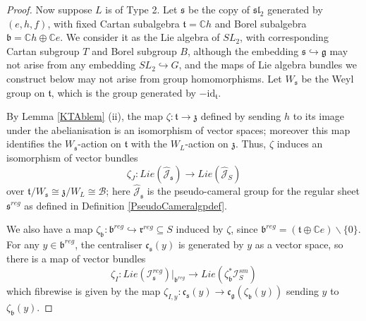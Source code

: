 \documentclass{amsart}
\theoremstyle{remark}
\numberwithin{theorem}{section}
\numberwithin{equation}{section}
\begin{document}
\begin{proof}
Now suppose $L$ is of Type 2. Let $\mathfrak{s}$ be the copy of $\mathfrak{sl}_2$ generated by $(e,h,f)$, with fixed Cartan subalgebra $\mathfrak{t} = \mathbb{C}h$ and Borel subalgebra $\mathfrak{b} = \mathbb{C}h \oplus \mathbb{C}e$. We consider it as the Lie algebra of $SL_2$, with corresponding Cartan subgroup $T$ and Borel subgroup $B$, although the embedding $\mathfrak{s} \hookrightarrow\mathfrak{g}$ may not arise from any embedding $SL_2 \hookrightarrow G$, and the maps of Lie algebra bundles we construct below may not arise from group homomorphisms. Let $W_{\mathfrak{s}}$ be the Weyl group on $\mathfrak{t}$, which is the group generated by $-\text{id}_{\mathfrak{t}}$. 

By Lemma \ref{KTAblem} (ii), the map $\zeta:\mathfrak{t} \rightarrow \mathfrak{z}$ defined by sending $h$ to its image under the abelianisation is an isomorphism of vector spaces; moreover this map identifies the $W_{\mathfrak{s}}$-action on $\mathfrak{t}$ with the $W_L$-action on $\mathfrak{z}$. Thus, $\zeta$ induces an isomorphism of vector bundles
\begin{equation}\label{MLCameralSMooth4eqn}
    \zeta_J:Lie(\hat{\mathcal J}_{\mathfrak{s}}) \rightarrow Lie(\hat{\mathcal J}_S)
\end{equation}
over $\mathfrak{t}/W_{\mathfrak{s}} \cong \mathfrak{z}/W_L \cong \mathcal B$; here $\hat{\mathcal J}_{\mathfrak{s}}$ is the pseudo-cameral group for the regular sheet $\mathfrak{s}^{reg}$ as defined in Definition \ref{PseudoCameralgpdef}.

We also have a map $\zeta_{\mathfrak{b}}:\mathfrak{b}^{reg} \hookrightarrow \mathfrak{r}^{reg} \subseteq S$ induced by $\zeta$, since $\mathfrak{b}^{reg} = (\mathfrak{t} \oplus \mathbb{C}e) \backslash\{0\}$. For any $y \in \mathfrak{b}^{reg}$, the centraliser $\mathfrak{c}_{\mathfrak{s}}(y)$ is generated by $y$ as a vector space, so there is a map of vector bundles
\begin{equation}\label{MLCameralSmooth5eqn}
    \zeta_I:Lie(\mathcal I_{\mathfrak{s}}^{reg})|_{\mathfrak{b}^{reg}} \rightarrow Lie(\zeta_{\mathfrak{b}}^*\mathcal I_S^{sm})
\end{equation}
which fibrewise is given by the map $\zeta_{I,y}:\mathfrak{c}_\mathfrak{s}(y) \rightarrow \mathfrak{c}_{\mathfrak{g}}(\zeta_{\mathfrak{b}}(y))$ sending $y$ to $\zeta_{\mathfrak{b}}(y)$.


\end{proof}
\end{document}
